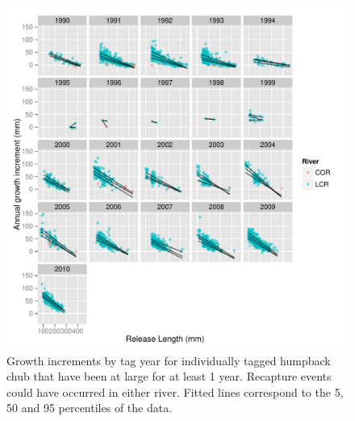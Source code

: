 
\begin{figure}[htbp]
	\centering
		\includegraphics[width=6.5in]{../FIGS/LSMR/fig:GrowthIncrements.pdf}
	\caption{Growth increments by tag year for individually tagged humpback chub that have been at large for at least 1 year.   Recapture events could have occurred in either river. Fitted lines correspond to the 5, 50 and 95 percentiles of the data.}
	\label{fig:FIGS_LSMR_fig:GrowthIncrements}
\end{figure}

